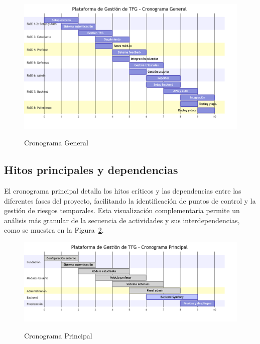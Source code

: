 \documentclass[12pt,a4paper,oneside]{report}
\providecommand{\pandocbounded}[1]{#1}
\begin{document}
\begin{figure}[H]
\centering
\pandocbounded{\includegraphics[keepaspectratio,alt={Cronograma General}]{processed/images/03_planificacion_mermaid_0.png}}
\caption{Cronograma General}
\label{fig:cronograma-general}
\end{figure}

\subsection{Hitos principales y
dependencias}\label{hitos-principales-y-dependencias}

El cronograma principal detalla los hitos críticos y las dependencias entre las diferentes fases del proyecto, facilitando la identificación de puntos de control y la gestión de riesgos temporales. Esta visualización complementaria permite un análisis más granular de la secuencia de actividades y sus interdependencias, como se muestra en la Figura~\ref{fig:cronograma-principal}.

\begin{figure}[H]
\centering
\pandocbounded{\includegraphics[keepaspectratio,alt={Cronograma Principal}]{processed/images/03_planificacion_mermaid_1.png}}
\caption{Cronograma Principal}
\label{fig:cronograma-principal}
\end{figure}
\end{document}
